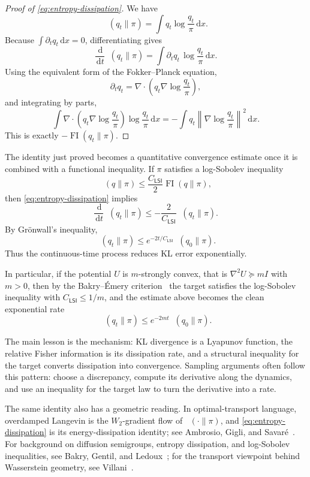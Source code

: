 \documentclass[10pt,a4paper]{amsart}
\numberwithin{equation}{section}
\DeclareMathOperator{\KL}{D_{\mathsf{KL}}}
\DeclareMathOperator{\FI}{FI}
\newcommand{\dd}{\,\mathrm{d}}
\newcommand{\Id}{I}
\newcommand{\norm}[1]{\left\lVert #1 \right\rVert}
\begin{document}
\begin{proof}[Proof of \eqref{eq:entropy-dissipation}]
We have
\[
    \KL(q_t\|\pi)=\int q_t\log\frac{q_t}{\pi}\dd x.
\]
Because $\int \partial_t q_t\dd x=0$, differentiating gives
\[
    \frac{\dd}{\dd t}\KL(q_t\|\pi)
    =
    \int \partial_tq_t\,\log\frac{q_t}{\pi}\dd x.
\]
Using the equivalent form of the Fokker--Planck equation,
\[
    \partial_tq_t
    =
    \nabla\cdot\!\left(q_t\nabla\log\frac{q_t}{\pi}\right),
\]
and integrating by parts,
\[
    \int
    \nabla\cdot\!\left(q_t\nabla\log\frac{q_t}{\pi}\right)
    \log\frac{q_t}{\pi}\dd x
    =
    -\int q_t\norm{\nabla\log\frac{q_t}{\pi}}^2\dd x.
\]
This is exactly $-\FI(q_t\|\pi)$.
\end{proof}

The identity just proved becomes a quantitative convergence estimate once it is
combined with a functional inequality.  If $\pi$ satisfies a log-Sobolev
inequality
\[
    \KL(q\|\pi)\leq \frac{C_{\mathsf{LSI}}}{2}\FI(q\|\pi),
\]
then \eqref{eq:entropy-dissipation} implies
\[
    \frac{\dd}{\dd t}\KL(q_t\|\pi)
    \leq
    -\frac{2}{C_{\mathsf{LSI}}}\KL(q_t\|\pi).
\]
By Gr\"onwall's inequality,
\[
    \KL(q_t\|\pi)
    \leq e^{-2t/C_{\mathsf{LSI}}}\KL(q_0\|\pi).
\]
Thus the continuous-time process reduces KL error exponentially.

In particular, if the potential $U$ is $m$-strongly convex, that is
$\nabla^2U\succeq m\Id$ with $m>0$, then by the Bakry--\'Emery
criterion~\cite{bakry2014analysis} the target satisfies the log-Sobolev
inequality with $C_{\mathsf{LSI}}\leq 1/m$, and the estimate above becomes the
clean exponential rate
\[
    \KL(q_t\|\pi)\leq e^{-2mt}\KL(q_0\|\pi).
\]

The main lesson is the mechanism: KL
divergence is a Lyapunov function, the relative Fisher information is its
dissipation rate, and a structural inequality for the target converts
dissipation into convergence.  Sampling arguments often follow this pattern:
choose a discrepancy, compute its derivative along the dynamics, and use an
inequality for the target law to turn the derivative into a rate.

The same identity also has a geometric reading.  In optimal-transport language,
overdamped Langevin is the $W_2$-gradient flow of $\KL(\cdot\|\pi)$, and
\eqref{eq:entropy-dissipation} is its energy-dissipation identity; see
Ambrosio, Gigli, and Savar\'e~\cite{ambrosio2008gradientflows}.  For background
on diffusion semigroups, entropy dissipation, and log-Sobolev inequalities, see
Bakry, Gentil, and Ledoux~\cite{bakry2014analysis}; for the transport viewpoint
behind Wasserstein geometry, see Villani~\cite{villani2009optimal}.
\end{document}
